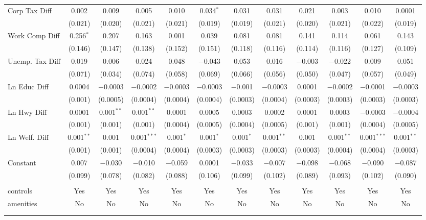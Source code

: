 \begin{table}[!htbp]
\begin{tabular}{@{\extracolsep{5pt}}lccccccccccc}
  Corp Tax Diff & 0.002 & 0.009 & 0.005 & 0.010 & 0.034$^{*}$ & 0.031 & 0.031 & 0.021 & 0.003 & 0.010 & 0.0001 \\ 
  & (0.021) & (0.020) & (0.021) & (0.021) & (0.019) & (0.019) & (0.021) & (0.020) & (0.021) & (0.022) & (0.019) \\ 
  Work Comp Diff & 0.256$^{*}$ & 0.207 & 0.163 & 0.001 & 0.039 & 0.081 & 0.081 & 0.141 & 0.114 & 0.061 & 0.143 \\ 
  & (0.146) & (0.147) & (0.138) & (0.152) & (0.151) & (0.118) & (0.116) & (0.114) & (0.116) & (0.127) & (0.109) \\ 
  Unemp. Tax Diff & 0.019 & 0.006 & 0.024 & 0.048 & $-$0.043 & 0.053 & 0.016 & $-$0.003 & $-$0.022 & 0.009 & 0.051 \\ 
  & (0.071) & (0.034) & (0.074) & (0.058) & (0.069) & (0.066) & (0.056) & (0.050) & (0.047) & (0.057) & (0.049) \\ 
  Ln Educ Diff & 0.0004 & $-$0.0003 & $-$0.0002 & $-$0.0003 & $-$0.0003 & $-$0.001 & $-$0.0003 & 0.0001 & $-$0.0002 & $-$0.0001 & $-$0.0003 \\ 
  & (0.001) & (0.0005) & (0.0004) & (0.0004) & (0.0004) & (0.0003) & (0.0004) & (0.0003) & (0.0003) & (0.0003) & (0.0003) \\ 
  Ln Hwy Diff & 0.0001 & 0.001$^{**}$ & 0.001$^{**}$ & 0.0001 & 0.0005 & 0.0003 & 0.0002 & 0.0001 & 0.0003 & $-$0.0003 & $-$0.0004 \\ 
  & (0.001) & (0.001) & (0.001) & (0.0004) & (0.0005) & (0.0004) & (0.0005) & (0.001) & (0.001) & (0.0004) & (0.0005) \\ 
  Ln Welf. Diff & 0.001$^{**}$ & 0.001 & 0.001$^{***}$ & 0.001$^{*}$ & 0.001$^{*}$ & 0.001$^{*}$ & 0.001$^{**}$ & 0.001 & 0.001$^{**}$ & 0.001$^{***}$ & 0.001$^{**}$ \\ 
  & (0.001) & (0.001) & (0.0004) & (0.0004) & (0.0003) & (0.0003) & (0.0003) & (0.0003) & (0.0004) & (0.0004) & (0.0003) \\ 
  Constant & 0.007 & $-$0.030 & $-$0.010 & $-$0.059 & 0.0001 & $-$0.033 & $-$0.007 & $-$0.098 & $-$0.068 & $-$0.090 & $-$0.087 \\ 
  & (0.099) & (0.078) & (0.082) & (0.088) & (0.106) & (0.099) & (0.102) & (0.089) & (0.093) & (0.102) & (0.090) \\ 
 \hline \\[-1.8ex] 
controls & Yes & Yes & Yes & Yes & Yes & Yes & Yes & Yes & Yes & Yes & Yes \\ 
amenities & No & No & No & No & No & No & No & No & No & No & No \\ 
\hline \\[-1.8ex] 
\hline 
\hline \\[-1.8ex] 
\end{tabular} 
\end{table} 

